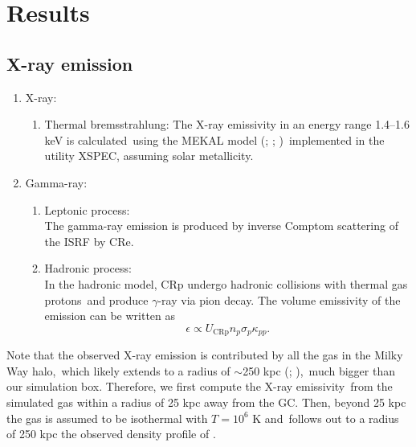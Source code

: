 \documentclass[twocolumn]{aastex631}
\begin{document}
\section{Results}


\subsection{X-ray emission}


  \begin{enumerate}
    \item X-ray:
       \begin{enumerate}
         \item Thermal bremsstrahlung: The X-ray emissivity in an energy range 1.4–1.6 keV is calculated\
               using the MEKAL model (\citealt{Xray-1}; \citealt{Xray-2}; \citealt{Xray-3})\
               implemented in the utility XSPEC\citep{XSPEC}, assuming solar metallicity.
       \end{enumerate}
    \item Gamma-ray:
       \begin{enumerate}
         \item Leptonic process:\\
          The gamma-ray emission is produced by inverse Comptom scattering of the ISRF by CRe.
         \item Hadronic process:\\
          In the hadronic model, CRp undergo hadronic collisions with thermal gas protons\
          and produce $\gamma$-ray via pion decay. The volume emissivity of the emission can be written as
          \begin{equation}
             \epsilon \propto U_{\text{CRp}}n_{p}\sigma_{p}\kappa_{pp}.
          \end{equation}
       \end{enumerate}
  \end{enumerate}



Note that the observed X-ray emission is contributed by all the gas in the Milky Way halo,\
which likely extends to a radius of $\sim$250 kpc (\citealt{halo-radius-1}; \citealt{halo-radius-2}),\
much bigger than our simulation box. Therefore, we first compute the X-ray emissivity\
from the simulated gas within a radius of 25 kpc away from the GC.
Then, beyond 25 kpc the gas is assumed to be isothermal with $T=10^6$ K and\
follows out to a radius of 250 kpc the observed density profile of \citep{temperature-MW}.
\end{document}
